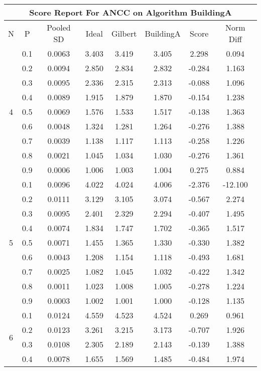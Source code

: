\documentclass[11pt,a4paper]{report}
\begin{document}
\begin{longtable}{ | c | c || c | c | c | c | c | c | }
\hline
\multicolumn{8}{|c|}{ Score Report For ANCC on Algorithm BuildingA} \\
\hline
N & P & Pooled SD &  Ideal &  Gilbert & BuildingA  & Score & Norm Diff \\
 \hline
 \hline
 \endhead
\multirow{9}{*}{4} & 0.1 & 0.0063 & 3.403 & 3.419 & 3.405 & 2.298 & 0.094 \\
 & 0.2 & 0.0094 & 2.850 & 2.834 & 2.832 & -0.284 & 1.163 \\
 & 0.3 & 0.0095 & 2.336 & 2.315 & 2.313 & -0.088 & 1.096 \\
 & 0.4 & 0.0089 & 1.915 & 1.879 & 1.870 & -0.154 & 1.238 \\
 & 0.5 & 0.0069 & 1.576 & 1.533 & 1.517 & -0.138 & 1.363 \\
 & 0.6 & 0.0048 & 1.324 & 1.281 & 1.264 & -0.276 & 1.388 \\
 & 0.7 & 0.0039 & 1.138 & 1.117 & 1.113 & -0.258 & 1.226 \\
 & 0.8 & 0.0021 & 1.045 & 1.034 & 1.030 & -0.276 & 1.361 \\
 & 0.9 & 0.0006 & 1.006 & 1.003 & 1.004 & 0.275 & 0.884 \\
 \hline
\multirow{9}{*}{5} & 0.1 & 0.0096 & 4.022 & 4.024 & 4.006 & -2.376 & -12.100 \\
 & 0.2 & 0.0111 & 3.129 & 3.105 & 3.074 & -0.567 & 2.274 \\
 & 0.3 & 0.0095 & 2.401 & 2.329 & 2.294 & -0.407 & 1.495 \\
 & 0.4 & 0.0074 & 1.834 & 1.747 & 1.702 & -0.365 & 1.517 \\
 & 0.5 & 0.0071 & 1.455 & 1.365 & 1.330 & -0.330 & 1.382 \\
 & 0.6 & 0.0043 & 1.208 & 1.154 & 1.118 & -0.493 & 1.681 \\
 & 0.7 & 0.0025 & 1.082 & 1.045 & 1.032 & -0.422 & 1.342 \\
 & 0.8 & 0.0011 & 1.023 & 1.008 & 1.005 & -0.278 & 1.224 \\
 & 0.9 & 0.0003 & 1.002 & 1.001 & 1.000 & -0.128 & 1.135 \\
 \hline
\multirow{9}{*}{6} & 0.1 & 0.0124 & 4.559 & 4.523 & 4.524 & 0.269 & 0.961 \\
 & 0.2 & 0.0123 & 3.261 & 3.215 & 3.173 & -0.707 & 1.926 \\
 & 0.3 & 0.0108 & 2.305 & 2.189 & 2.143 & -0.139 & 1.388 \\
 & 0.4 & 0.0078 & 1.655 & 1.569 & 1.485 & -0.484 & 1.974 \\

\end{longtable}
\end{document}
